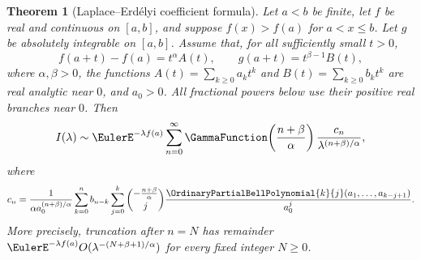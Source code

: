 \documentclass[11pt,a4paper,oneside,openany]{book}
\newtheorem{theorem}{Theorem}[chapter]
\theoremstyle{definition}
\theoremstyle{remark}
\begin{document}
\begin{theorem}[Laplace--Erd\'elyi coefficient formula]
\label{thm:laplace-bell}
Let $a<b$ be finite, let $f$ be real and continuous on $[a,b]$, and suppose
$f(x)>f(a)$ for $a<x\le b$.  Let $g$ be absolutely integrable on $[a,b]$.
Assume that, for all sufficiently small $t>0$,
\[
 f(a+t)-f(a)=t^\alpha A(t),\qquad
 g(a+t)=t^{\beta-1}B(t),
\]
where $\alpha,\beta>0$, the functions $A(t)=\sum_{k\ge0}a_kt^k$ and
$B(t)=\sum_{k\ge0}b_kt^k$ are real analytic near $0$, and $a_0>0$.
All fractional powers below use their positive real branches near $0$.
Then
\begin{equation}\label{eq:laplace-asymptotic}
 I(\lambda)\sim \EulerE^{-\lambda f(a)}
 \sum_{n=0}^{\infty}
 \GammaFunction\!\left(\frac{n+\beta}{\alpha}\right)
 \frac{c_n}{\lambda^{(n+\beta)/\alpha}},
\end{equation}
where
\begin{equation}\label{eq:laplace-cn}
 c_n=\frac1{\alpha a_0^{(n+\beta)/\alpha}}
 \sum_{k=0}^{n}b_{n-k}
 \sum_{j=0}^{k}
 \binom{-\frac{n+\beta}{\alpha}}{j}
 \frac{\OrdinaryPartialBellPolynomial{k}{j}(a_1,\ldots,a_{k-j+1})}{a_0^j}.
\end{equation}
More precisely, truncation after $n=N$ has remainder
$\EulerE^{-\lambda f(a)}O(\lambda^{-(N+\beta+1)/\alpha})$ for every
fixed integer $N\ge0$.
\end{theorem}
\end{document}
